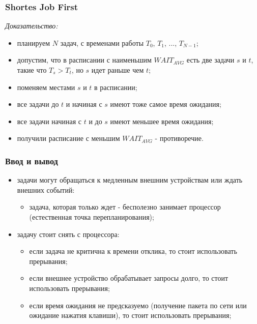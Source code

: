 \begin{frame}
\frametitle{Shortes Job First}

\emph{Доказательство:}
\begin{itemize}
  \item планируем $N$ задач, с временами работы $T_0$, $T_1$, ..., $T_{N-1}$;
  \item допустим, что в расписании с наименьшим $WAIT_{AVG}$ есть две
        задачи $s$ и $t$, такие что $T_s > T_t$, но $s$ идет раньше чем $t$;
  \item поменяем местами $s$ и $t$ в расписании;
  \item все задачи до $t$ и начиная с $s$ имеют тоже самое время ожидания;
  \item все задачи начиная с $t$ и до $s$ имеют меньшее время ожидания;
  \item получили расписание с меньшим $WAIT_{AVG}$ - противоречие.
\end{itemize}
\end{frame}

\begin{frame}
\frametitle{Ввод и вывод}

\begin{itemize}
  \item<1-> задачи могут обращаться к медленным внешним устройствам или ждать
            внешних событий:
              \begin{itemize}
                \item задача, которая только ждет - бесполезно занимает
                      процессор (естественная точка перепланирования);
              \end{itemize}
  \item<2-> задачу стоит снять с процессора:
     \begin{itemize}
       \item если задача не критична к времени отклика, то стоит использовать
             прерывания;
       \item если внешнее устройство обрабатывает запросы долго, то стоит
             использовать прерывания;
       \item если время ожидания не предсказуемо (получение пакета по сети или
             ожидание нажатия клавиши), то стоит использовать прерывания;
     \end{itemize}
\end{itemize}
\end{frame}

